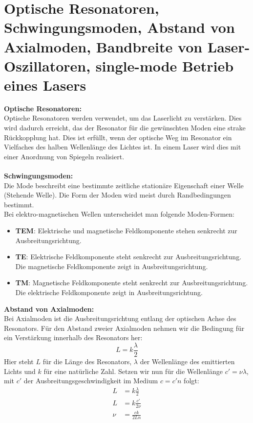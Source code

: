 \section{Optische Resonatoren, Schwingungsmoden, Abstand von Axialmoden, Bandbreite von Laser-Oszillatoren, single-mode Betrieb eines Lasers}
\textbf{Optische Resonatoren:}\\
Optische Resonatoren werden verwendet, um das Laserlicht zu verstärken.
Dies wird dadurch erreicht, das der Resonator für die gewünschten Moden eine strake Rückkopplung hat.
Dies ist erfüllt, wenn der optische Weg im Resonator ein Vielfaches des halben Wellenlänge des Lichtes ist.
In einem Laser wird dies mit einer Anordnung von Spiegeln realisiert.\\\\
\textbf{Schwingungsmoden:}\\
Die Mode beschreibt eine bestimmte zeitliche stationäre Eigenschaft einer Welle (Stehende Welle).
Die Form der Moden wird meist durch Randbedingungen bestimmt.\\
Bei elektro-magnetischen Wellen unterscheidet man folgende Moden-Formen:
\begin{itemize}
    \item \textbf{TEM}:
    Elektrische und magnetische Feldkomponente stehen senkrecht zur Ausbreitungsrichtung.
    \item \textbf{TE}:
    Elektrische Feldkomponente steht senkrecht zur Ausbreitungsrichtung. Die magnetische Feldkomponente zeigt in Ausbreitungsrichtung.
    \item \textbf{TM}:
    Magnetische Feldkomponente steht senkrecht zur Ausbreitungsrichtung. Die elektrische Feldkomponente zeigt in Ausbreitungsrichtung.
\end{itemize}
\textbf{Abstand von Axialmoden:}\\
Bei Axialmoden ist die Ausbreitungsrichtung entlang der optischen Achse des Resonators.
Für den Abstand zweier Axialmoden nehmen wir die Bedingung für ein Verstärkung innerhalb des Resonators her:
\begin{equation}
    L=k\frac{\lambda}{2}
\end{equation}
Hier steht $L$ für die Länge des Resonators, $\lambda$ der Wellenlänge des emittierten Lichts und $k$ für eine natürliche Zahl.
Setzen wir nun für die Wellenlänge $c'=\nu\lambda$, mit $c'$ der Ausbreitungsgeschwindigkeit im Medium $c=c'n$ folgt:
\begin{align}
    L&=k\frac{\lambda}{2}\\
    L&=k\frac{c'}{2\nu}\\
    \nu&=\frac{ck}{2Ln}
\end{align}
